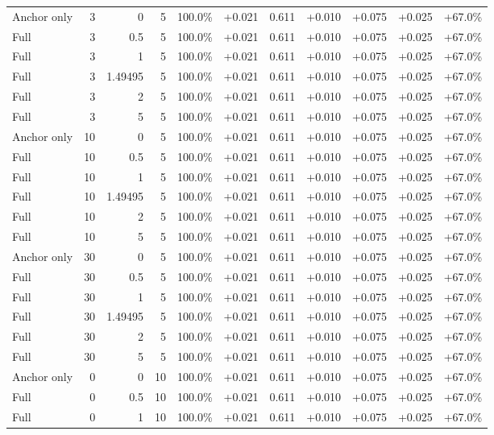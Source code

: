 \begin{table}[htbp]
\begin{tabular}{lrrrccccccc}
Anchor only & 3 & 0 & 5 & 100.0\% & +0.021 & 0.611 & +0.010 & +0.075 & +0.025 & +67.0\% \\
Full & 3 & 0.5 & 5 & 100.0\% & +0.021 & 0.611 & +0.010 & +0.075 & +0.025 & +67.0\% \\
Full & 3 & 1 & 5 & 100.0\% & +0.021 & 0.611 & +0.010 & +0.075 & +0.025 & +67.0\% \\
Full & 3 & 1.49495 & 5 & 100.0\% & +0.021 & 0.611 & +0.010 & +0.075 & +0.025 & +67.0\% \\
Full & 3 & 2 & 5 & 100.0\% & +0.021 & 0.611 & +0.010 & +0.075 & +0.025 & +67.0\% \\
Full & 3 & 5 & 5 & 100.0\% & +0.021 & 0.611 & +0.010 & +0.075 & +0.025 & +67.0\% \\
Anchor only & 10 & 0 & 5 & 100.0\% & +0.021 & 0.611 & +0.010 & +0.075 & +0.025 & +67.0\% \\
Full & 10 & 0.5 & 5 & 100.0\% & +0.021 & 0.611 & +0.010 & +0.075 & +0.025 & +67.0\% \\
Full & 10 & 1 & 5 & 100.0\% & +0.021 & 0.611 & +0.010 & +0.075 & +0.025 & +67.0\% \\
Full & 10 & 1.49495 & 5 & 100.0\% & +0.021 & 0.611 & +0.010 & +0.075 & +0.025 & +67.0\% \\
Full & 10 & 2 & 5 & 100.0\% & +0.021 & 0.611 & +0.010 & +0.075 & +0.025 & +67.0\% \\
Full & 10 & 5 & 5 & 100.0\% & +0.021 & 0.611 & +0.010 & +0.075 & +0.025 & +67.0\% \\
Anchor only & 30 & 0 & 5 & 100.0\% & +0.021 & 0.611 & +0.010 & +0.075 & +0.025 & +67.0\% \\
Full & 30 & 0.5 & 5 & 100.0\% & +0.021 & 0.611 & +0.010 & +0.075 & +0.025 & +67.0\% \\
Full & 30 & 1 & 5 & 100.0\% & +0.021 & 0.611 & +0.010 & +0.075 & +0.025 & +67.0\% \\
Full & 30 & 1.49495 & 5 & 100.0\% & +0.021 & 0.611 & +0.010 & +0.075 & +0.025 & +67.0\% \\
Full & 30 & 2 & 5 & 100.0\% & +0.021 & 0.611 & +0.010 & +0.075 & +0.025 & +67.0\% \\
Full & 30 & 5 & 5 & 100.0\% & +0.021 & 0.611 & +0.010 & +0.075 & +0.025 & +67.0\% \\
Anchor only & 0 & 0 & 10 & 100.0\% & +0.021 & 0.611 & +0.010 & +0.075 & +0.025 & +67.0\% \\
Full & 0 & 0.5 & 10 & 100.0\% & +0.021 & 0.611 & +0.010 & +0.075 & +0.025 & +67.0\% \\
Full & 0 & 1 & 10 & 100.0\% & +0.021 & 0.611 & +0.010 & +0.075 & +0.025 & +67.0\% \\

\end{tabular}
\end{table}
